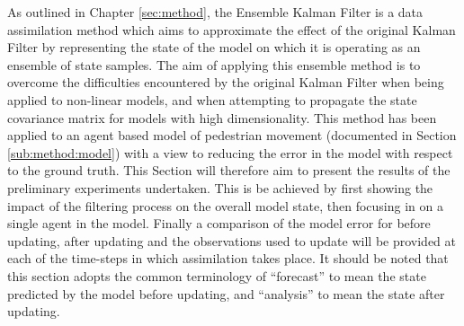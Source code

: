 


As outlined in Chapter \ref{sec:method}, the Ensemble Kalman Filter is a data
assimilation method which aims to approximate the effect of the original Kalman
Filter by representing the state of the model on which it is operating as an
ensemble of state samples.
The aim of applying this ensemble method is to overcome the difficulties
encountered by the original Kalman Filter when being applied to non-linear
models, and when attempting to propagate the state covariance matrix for models
with high dimensionality.
This method has been applied to an agent based model of pedestrian movement
(documented in Section \ref{sub:method:model}) with a view to reducing the error
in the model with respect to the ground truth.
This Section will therefore aim to present the results of the preliminary
experiments undertaken.
This is be achieved by first showing the impact of the filtering process on the
overall model state, then focusing in on a single agent in the model.
Finally a comparison of the model error for before updating, after updating and
the observations used to update will be provided at each of the time-steps in
which assimilation takes place.
It should be noted that this section adopts the common terminology of
``forecast'' to mean the state predicted by the model before updating, and
``analysis'' to mean the state after updating.

